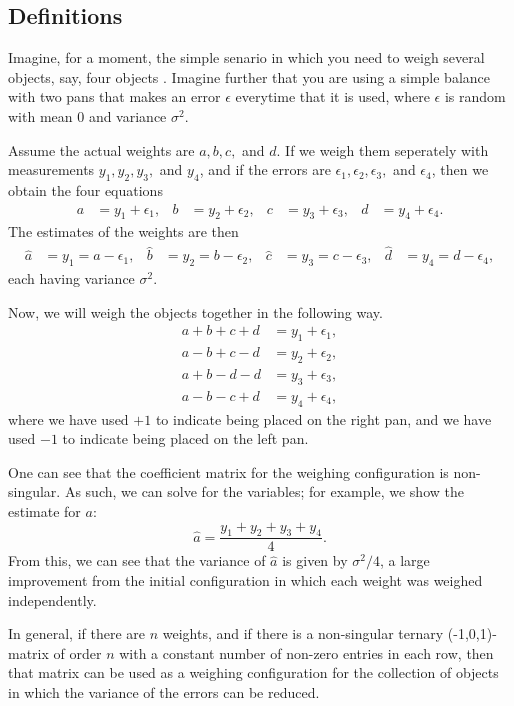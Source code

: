 \documentclass[../../../main]{subfiles}
\begin{document}
\subsection{Definitions}
 Imagine, for a moment, the simple senario in which you need to weigh several objects, say, four objects \cite[see][Chapter 2]{error-correcting-codes-v1}. Imagine further that you are using a simple balance with two pans that makes an error $\epsilon$ everytime that it is used, where $\epsilon$ is random with mean 0 and variance $\sigma^2$. 
 
 Assume the actual weights are $a,b,c,$ and $d$. If we weigh them seperately with measurements $y_1,y_2,y_3,$ and $y_4$, and if the errors are $\epsilon_1,\epsilon_2,\epsilon_3,$ and $\epsilon_4$, then we obtain the four equations
 \begin{align*}
  a &= y_1 + \epsilon_1, &
  b &= y_2 + \epsilon_2, &
  c &= y_3 + \epsilon_3, &
  d &= y_4 + \epsilon_4.
 \end{align*}
 The estimates of the weights are then
 \begin{align*}
  \hat a &= y_1 = a - \epsilon_1, & 
  \hat b &= y_2 = b - \epsilon_2, &
  \hat c &= y_3 = c - \epsilon_3, &
  \hat d &= y_4 = d - \epsilon_4,
 \end{align*}
 each having variance $\sigma^2$.
 
 Now, we will weigh the objects together in the following way.
 \begin{align*}
  a + b + c + d &= y_1 + \epsilon_1, \\
  a - b + c - d &= y_2 + \epsilon_2, \\
  a + b - d - d &= y_3 + \epsilon_3, \\
  a - b - c + d &= y_4 + \epsilon_4,
 \end{align*}
 where we have used $+1$ to indicate being placed on the right pan, and we have used $-1$ to indicate being placed on the left pan. 
 
 One can see that the coefficient matrix for the weighing configuration is non-singular. As such, we can solve for the variables; for example, we show the estimate for $a$:
 $$
 \hat a = \frac{y_1 + y_2 + y_3 + y_4}{4}.
 $$
 From this, we can see that the variance of $\hat a$ is given by $\sigma^2/4$, a large improvement from the initial configuration in which each weight was weighed independently.
 
 In general, if there are $n$ weights, and if there is a non-singular ternary (-1,0,1)-matrix of order $n$ with a constant number of non-zero entries in each row, then that matrix can be used as a weighing configuration for the collection of objects in which the variance of the errors can be reduced. 
 
\end{document}
